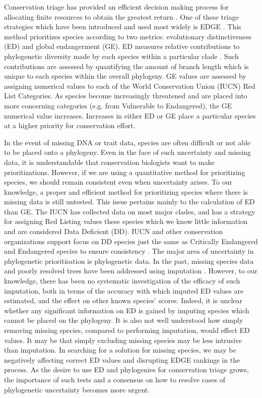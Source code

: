 \documentclass[12pt,english]{article}
\begin{document}
Conservation triage has provided an efficient decision making process
for allocating finite resources to obtain the greatest return
\autocite{Bottrill2008}. One of these triage strategies which have been
introduced and used most widely is EDGE \autocite{Isaac2007}. This
method prioritizes species according to two metrics: evolutionary
distinctiveness (ED) and global endangerment (GE). ED measures
relative contributions to phylogenetic diversity made by each species
within a particular clade \autocite{Isaac2007}. Such contributions are
assessed by quantifying the amount of branch length which is unique to
each species within the overall phylogeny. GE values are assessed by
assigning numerical values to each of the World Conservation Union
(IUCN) Red List Categories. As species become increasingly threatened
and are placed into more concerning categories (e.g. from Vulnerable
to Endangered), the GE numerical value increases. Increases in either
ED or GE place a particular species at a higher priority for
conservation effort.

In the event of missing DNA or trait data, species are often difficult
or not able to be placed onto a phylogeny. Even in the face of such
uncertainty and missing data, it is understandable that conservation
biologists want to make prioritizations. However, if we are using a
quantitative method for prioritizing species, we should remain
consistent even when uncertainty arises. To our knowledge, a proper
and efficient method for prioritizing species where there is missing
data is still untested. This issue pertains mainly to the calculation
of ED than GE. The IUCN has collected data on most major clades, and
has a strategy for assigning Red Listing values these species which we
know little information and are considered Data Deficient (DD). IUCN
and other conservation organizations support focus on DD species just
the same as Critically Endangered and Endangered species to ensure
consistency \autocite{Rodrigues2006}. The major area of uncertainty in
phylogenetic prioritisation is phylogenetic data. In the past, missing
species data and poorly resolved trees have been addressed using
imputation \autocite{Collen2011, Isaac2012, Jetz2014}. However, to our knowledge, there has been no systematic
investigation of the efficacy of such imputation, both in terms of the
accuracy with which imputed ED values are estimated, and the effect on
other known species’ scores. Indeed, it is unclear whether any
significant information on ED is gained by imputing species which
cannot be placed on the phylogeny. It is also not well understood how
simply removing missing species, compared to performing imputation,
would effect ED values. It may be that simply excluding missing
species may be less intrusive than imputation. In searching for a
solution for missing species, we may be negatively affecting correct
ED values and disrupting EDGE rankings in the process. As the desire
to use ED and phylogenies for conservation triage grows, the
importance of such tests and a consensus on how to resolve cases of
phylogenetic uncertainty becomes more urgent.
\end{document}
